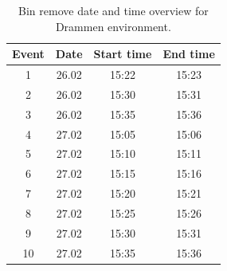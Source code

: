 \begin{table}[H]
\centering
\caption{Bin remove date and time overview for Drammen environment.}
\label{tab:BR_dateandtimeDrammen}
\begin{tabular}{|c|c|c|c|}
\hline
\textbf{Event} & \textbf{Date} & \textbf{Start time} & \textbf{End time} \\ \hline
1              & 26.02         & 15:22               & 15:23             \\ \hline
2              & 26.02         & 15:30               & 15:31             \\ \hline
3              & 26.02         & 15:35               & 15:36             \\ \hline
4              & 27.02         & 15:05               & 15:06             \\ \hline
5              & 27.02         & 15:10               & 15:11             \\ \hline
6              & 27.02         & 15:15               & 15:16             \\ \hline
7              & 27.02         & 15:20               & 15:21             \\ \hline
8              & 27.02         & 15:25               & 15:26             \\ \hline
9              & 27.02         & 15:30               & 15:31             \\ \hline
10             & 27.02         & 15:35               & 15:36             \\ \hline
\end{tabular}
\end{table}


